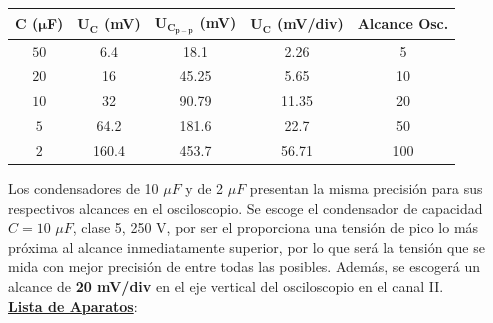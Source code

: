 \documentclass[a4paper,titlepage]{article}
\begin{document}
{\setlength{\arrayrulewidth}{0.75pt}
\begin{table}[htbp]
    \centering
    \begin{tabular}[t]{c|c|c|c|c}
        \textbf{C} \small\textbf{($\mathbf{\mu}$F)}& $\mathbf{U_C}$ \small\textbf{(mV)}& $\mathbf{U_{C_{p-p}}}$ \small\textbf{(mV)} & $\mathbf{U_C}$ \small\textbf{(mV/div)}& \small\textbf{Alcance Osc.}\\
        \hline
        $50$  &  6.4  &  18.1  &  2.26  & 5 \\
        \hline
        $20$  &  16  & 45.25   &  5.65  & 10 \\
        \hline
        $10$  &  32  &  90.79  &  11.35  & 20 \\
        \hline
        $5$  &  64.2  &  181.6  &  22.7  & 50 \\
            \hline
        $2$  &  160.4  &  453.7  &  56.71  & 100 \\
    \end{tabular}
\end{table} 

\noindent Los condensadores de 10 $\mu F$ y de 2 $\mu F$ presentan la misma precisión para sus respectivos alcances en el osciloscopio. Se escoge el condensador de capacidad $C=10$ $\mu F$, clase 5, 250 V, por ser el proporciona una tensión de pico lo más próxima al alcance inmediatamente superior, por lo que será la tensión que se mida con mejor precisión de entre todas las posibles.
Además, se escogerá un alcance de \textbf{20 mV/div} en el eje vertical del osciloscopio en el canal II.\\

\noindent\textbf{\underline{Lista de Aparatos}}:\\

}
\end{document}
